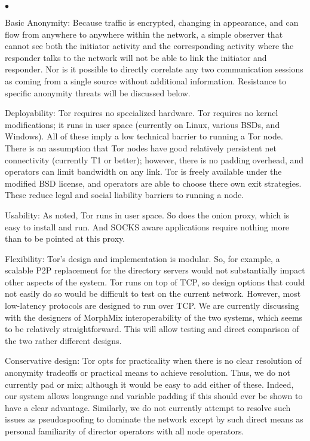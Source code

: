 \documentclass[times,10pt,twocolumn]{article}
\newenvironment{tightlist}{\begin{list}{$\bullet$}{
  \setlength{\itemsep}{0mm}
    \setlength{\parsep}{0mm}
    }}{\end{list}}
\begin{document}
\begin{tightlist}
\item [Basic Anonymity:] Because traffic is encrypted, changing in
  appearance, and can flow from anywhere to anywhere within the
  network, a simple observer that cannot see both the initiator
  activity and the corresponding activity where the responder talks to
  the network will not be able to link the initiator and responder.
  Nor is it possible to directly correlate any two communication
  sessions as coming from a single source without additional
  information. Resistance to specific anonymity threats will be discussed
  below.
  
\item[Deployability:] Tor requires no specialized hardware. Tor
  requires no kernel modifications; it runs in user space (currently
  on Linux, various BSDs, and Windows). All of these imply a low
  technical barrier to running a Tor node. There is an assumption that
  Tor nodes have good relatively persistent net connectivity
  (currently T1 or better);
  however, there is no padding overhead, and operators can limit
  bandwidth on any link.  Tor is freely available under the modified
  BSD license, and operators are able to choose there own exit
  strategies. These reduce legal and social liability barriers to
  running a node.
  
\item[Usability:] As noted, Tor runs in user space. So does the onion
  proxy, which is easy to install and run. And SOCKS aware
  applications require nothing more than to be pointed at this proxy.
  
\item[Flexibility:] Tor's design and implementation is modular.  So,
  for example, a scalable P2P replacement for the directory servers
  would not substantially impact other aspects of the system.  Tor
  runs on top of TCP, so design options that could not easily do so
  would be difficult to test on the current network. However, most
  low-latency protocols are designed to run over TCP. We are currently
  discussing with the designers of MorphMix interoperability of the
  two systems, which seems to be relatively straightforward. This will
  allow testing and direct comparison of the two rather different
  designs.

  
\item[Conservative design:] Tor opts for practicality when there is no
  clear resolution of anonymity tradeoffs or practical means to
  achieve resolution. Thus, we do not currently pad or mix; although
  it would be easy to add either of these. Indeed, our system allows
  longrange and variable padding if this should ever be shown to have
  a clear advantage.  Similarly, we do not currently attempt to
  resolve such issues as pseudospoofing to dominate the network except
  by such direct means as personal familiarity of director operators
  with all node operators.
\end{tightlist}
\end{document}
